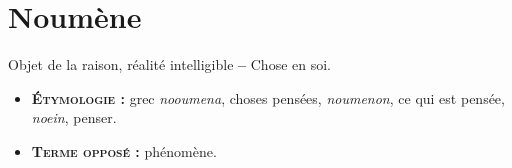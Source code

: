 \section{Noumène}
Objet de la raison, réalité intelligible {\bf --} Chose en soi.
{\footnotesize
\begin{itemize}[leftmargin=1cm, label=, itemsep=1pt]
\item {\bf \textsc{Étymologie} :} grec {\it nooumena}, choses pensées, {\it noumenon}, ce qui est pensée, {\it noein}, penser.
\item {\bf \textsc{Terme opposé} :} phénomène.
\end{itemize}
}
